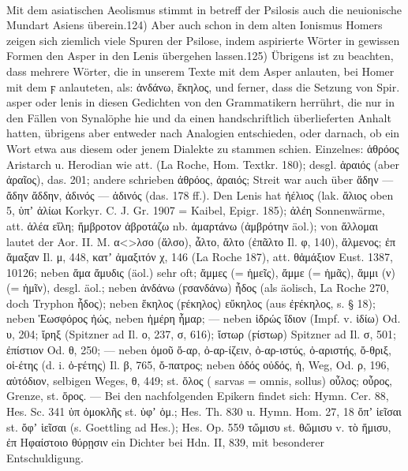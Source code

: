 \paragraph{} Mit dem asiatischen Aeolismus stimmt in betreff der Psilosis auch
die neuionische Mundart Asiens überein.124) Aber auch schon in dem alten
Ionismus Homers zeigen sich ziemlich viele Spuren der Psilose, indem aspirierte
Wörter in gewissen Formen den Asper in den Lenis übergehen lassen.125) Übrigens
ist zu beachten, dass mehrere Wörter, die in unserem Texte mit dem Asper
anlauten, bei Homer mit dem ϝ anlauteten, als: ἁνδάνω, ἕκηλος, und ferner, dass
die Setzung von Spir. asper oder lenis in diesen Gedichten von den Grammatikern
herrührt, die nur in den Fällen von Synalöphe hie und da einen handschriftlich
überlieferten Anhalt hatten, übrigens aber entweder nach Analogien entschieden,
oder darnach, ob ein Wort etwa aus diesem oder jenem Dialekte zu stammen schien.
Einzelnes: ἁθρόος Aristarch u. Herodian wie att. (La Roche, Hom. Textkr. 180);
desgl. ἁραιός (aber ἀραῖος), das. 201; andere schrieben ἀθρόος, ἀραιός; Streit
war auch über ἅδην — ἄδην ἄδδην, ἁδινός — ἀδινός (das. 178 ff.). Den Lenis hat
ἠέλιος (lak. ἄλιος oben 5, ὑπʼ ἀλίωι Korkyr. C. J. Gr. 1907 = Kaibel, Epigr.
185); ἀλέη Sonnenwärme, att. ἁλέα εἵλη; ἤμβροτον ἀβροτάζω nb. ἁμαρτάνω (ἀμβρότην
äol.); von ἅλλομαι lautet der Aor. II. M. α<>λσο (ἄλσο), ἆλτο, ἄλτο (ἐπᾶλτο Il.
φ, 140), ἄλμενος; ἐπ ἄμαξαν Il. μ, 448, κατʼ ἀμαξιτόν χ, 146 (La Roche 187),
att. θἀμάξιον Eust. 1387, 10126; neben ἅμα ἄμυδις (äol.) sehr oft; ἄμμες (=
ἡμεῖς), ἄμμε (= ἡμᾶς), ἄμμι (ν) (= ἡμῖν), desgl. äol.; neben ἁνδάνω (ϝσανδάνω)
ἦδος (als äolisch, La Roche 270, doch Tryphon ἧδος); neben ἕκηλος (ϝέκηλος)
εὔκηλος (aus ἐϝέκηλος, s. § 18); neben Ἑωσφόρος ἠώς, neben ἡμέρη ἦμαρ; — neben
ἱδρώς ἴδιον (Impf. v. ἰδίω) Od. υ, 204; ἴρηξ (Spitzner ad Il. ο, 237, σ, 616);
ἴστωρ (ϝίστωρ) Spitzner ad Il. σ, 501; ἐπίστιον Od. θ, 250; — neben ὁμοῦ ὄ-αρ,
ὀ-αρ-ίζειν, ὀ-αρ-ιστύς, ὀ-αριστής, ὄ-θριξ, οἰ-έτης (d. i. ὀ-ϝέτης) Il. β, 765,
ὄ-πατρος; neben ὁδός οὐδός, ἡ, Weg, Od. ρ, 196, αὐτόδιον, selbigen Weges, θ,
449; st. ὅλος ( sarvas = omnis,  sollus) οὖλος; οὖρος, Grenze, st.
ὅρος. — Bei den nachfolgenden Epikern findet sich: Hymn. Cer. 88, Hes. Sc. 341
ὑπ ὀμοκλῆς st. ὑφʼ ὁμ.; Hes. Th. 830 u. Hymn. Hom. 27, 18 ὄπʼ ἰεῖσαι st. ὄφʼ
ἱεῖσαι (s. Goettling ad Hes.); Hes. Op. 559 τὤμισυ st. θὤμισυ v. τὸ ἥμισυ, ἐπ
Ηφαίστοιο θύρῃσιν ein Dichter bei Hdn. II, 839, mit besonderer Entschuldigung. 

